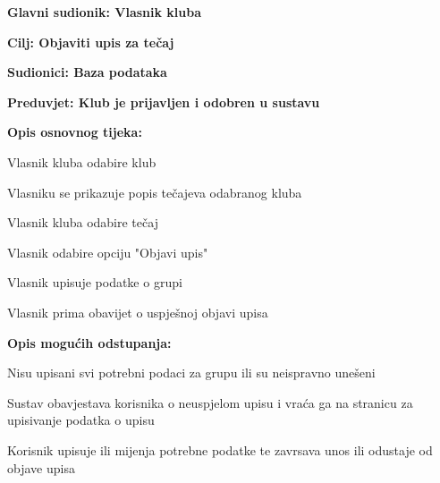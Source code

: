 						\noindent {}
						\begin{packed_item}
							
							\item \textbf{Glavni sudionik: Vlasnik kluba}
							\item  \textbf{Cilj: Objaviti upis za tečaj} 
							\item  \textbf{Sudionici: Baza podataka}
							\item  \textbf{Preduvjet: Klub je prijavljen i odobren u sustavu}
							\item  \textbf{Opis osnovnog tijeka: }
							
							\item[] \begin{packed_enum}
								
								\item Vlasnik kluba odabire klub
								\item Vlasniku se prikazuje popis tečajeva odabranog kluba
								\item Vlasnik kluba odabire tečaj
								\item Vlasnik odabire opciju "Objavi upis"
								\item Vlasnik upisuje podatke o grupi
								\item Vlasnik prima obavijet o uspješnoj objavi upisa
							\end{packed_enum}
							
							\item  \textbf{Opis mogućih odstupanja:}
							
							\item[] \begin{packed_item}
								
								\item[2.a] Nisu upisani svi potrebni podaci za grupu ili su neispravno unešeni
								\item[] \begin{packed_enum}
									
									\item Sustav obavjestava korisnika o neuspjelom upisu i vraća ga na stranicu za upisivanje podatka o upisu
									\item Korisnik upisuje ili mijenja potrebne podatke te zavrsava unos ili odustaje od objave upisa
									
								\end{packed_enum}
								
							\end{packed_item}
							
						\end{packed_item}
						\newpage
						
